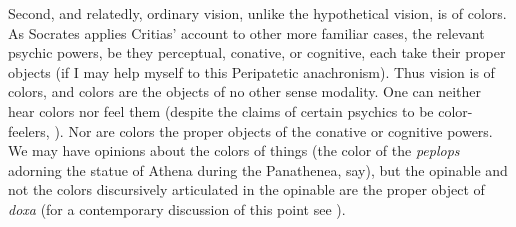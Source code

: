Second, and relatedly, ordinary vision, unlike the hypothetical vision, is of colors. As Socrates applies Critias' account to other more familiar cases, the relevant psychic powers, be they perceptual, conative, or cognitive, each take their proper objects (if I may help myself to this Peripatetic anachronism). Thus vision is of colors, and colors are the objects of no other sense modality. One can neither hear colors nor feel them (despite the claims of certain psychics to be color-feelers, \citealt{Duplessis:1975aa}). Nor are colors the proper objects of the conative or cognitive powers. We may have opinions about the colors of things (the color of the \emph{peplops} adorning the statue of Athena during the Panathenea, say), but the opinable and not the colors discursively articulated in the opinable are the proper object of \emph{doxa} (for a contemporary discussion of this point see \citealt[section 5]{Kalderon:2011fk}). 

